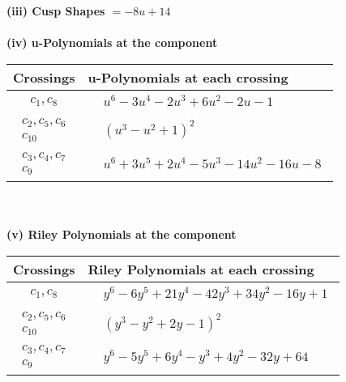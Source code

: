 \documentclass[1p]{elsarticle_modified}
\theoremstyle{definition}
\begin{document}
\flushleft \textbf{(iii) Cusp Shapes $= -8 u+14$}\\~\\
\newpage\renewcommand{\arraystretch}{1}
\flushleft \textbf{(iv) u-Polynomials at the component}\newline \\
\begin{tabular}{m{50pt}|m{274pt}}
Crossings & \hspace{64pt}u-Polynomials at each crossing \\
\hline $$\begin{aligned}c_{1},c_{8}\end{aligned}$$&$\begin{aligned}
&u^6-3 u^4-2 u^3+6 u^2-2 u-1
\end{aligned}$\\
\hline $$\begin{aligned}c_{2},c_{5},c_{6}\\c_{10}\end{aligned}$$&$\begin{aligned}
&(u^3- u^2+1)^2
\end{aligned}$\\
\hline $$\begin{aligned}c_{3},c_{4},c_{7}\\c_{9}\end{aligned}$$&$\begin{aligned}
&u^6+3 u^5+2 u^4-5 u^3-14 u^2-16 u-8
\end{aligned}$\\
\hline
\end{tabular}\\~\\
\newpage\renewcommand{\arraystretch}{1}
\flushleft \textbf{(v) Riley Polynomials at the component}\newline \\
\begin{tabular}{m{50pt}|m{274pt}}
Crossings & \hspace{64pt}Riley Polynomials at each crossing \\
\hline $$\begin{aligned}c_{1},c_{8}\end{aligned}$$&$\begin{aligned}
&y^6-6 y^5+21 y^4-42 y^3+34 y^2-16 y+1
\end{aligned}$\\
\hline $$\begin{aligned}c_{2},c_{5},c_{6}\\c_{10}\end{aligned}$$&$\begin{aligned}
&(y^3- y^2+2 y-1)^2
\end{aligned}$\\
\hline $$\begin{aligned}c_{3},c_{4},c_{7}\\c_{9}\end{aligned}$$&$\begin{aligned}
&y^6-5 y^5+6 y^4- y^3+4 y^2-32 y+64
\end{aligned}$\\
\hline
\end{tabular}\\~\\
\end{document}
